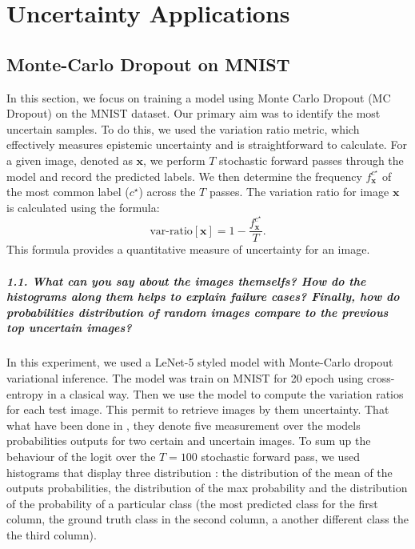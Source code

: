 \graphicspath{{figs/3c}}

\chapter{Uncertainty Applications}
\section{Monte-Carlo Dropout on MNIST}
In this section, we focus on training a model using Monte Carlo Dropout (MC Dropout) on the MNIST dataset. Our primary aim was to identify the most uncertain samples. To do this, we used the variation ratio metric, which effectively measures epistemic uncertainty and is straightforward to calculate. For a given image, denoted as $ \mathbf{x} $, we perform $ T $ stochastic forward passes through the model and record the predicted labels. We then determine the frequency $ f^{c^\star }_\mathbf{x} $ of the most common label ($ c^\star $) across the $ T $ passes. The variation ratio for image $ \mathbf{x} $ is calculated using the formula:
\[
    \text{var-ratio}[\mathbf{x}] = 1 - \frac{f^{c^\star }_\mathbf{x}}{T}
.\]
This formula provides a quantitative measure of uncertainty for an image.


\paragraph*{1.1. What can you say about the images themselfs? How do the histograms along them helps to explain failure cases? Finally, how do probabilities distribution of random images compare to the previous top uncertain images?}

In this experiment, we used a LeNet-5 styled model with Monte-Carlo dropout variational inference. The model was train on MNIST for 20 epoch using cross-entropy in a clasical way. Then we use the model to compute the variation ratios for each test image. This permit to retrieve images by them uncertainty. That what have been done in , they denote five measurement over the models probabilities outputs for two certain and uncertain images. To sum up the behaviour of the logit over the $ T=100 $ stochastic forward pass, we used histograms that display three distribution : the distribution of the mean of the outputs probabilities, the distribution of the max probability and the distribution of the probability of a particular class (the most predicted class for the first column, the ground truth class in the second column, a another different class the the third column).

